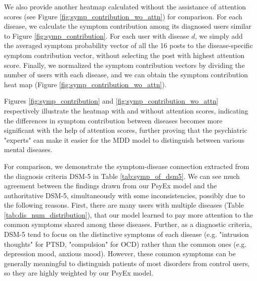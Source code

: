 We also provide another heatmap calculated without the assistance of attention scores (see Figure \ref{fig:symp_contribution_wo_attn}) for comparison.
For each disease, we calculate the symptom contribution among its diagnosed users similar to Figure \ref{fig:symp_contribution}. For each user with disease $d$, we simply add the averaged symptom probability vector of all the 16 posts to the disease-specific symptom contribution vector, without selecting the post with highest attention score.
Finally, we normalized the symptom contribution vectors by dividing the number of users with each disease, and we can obtain the symptom contribution heat map (Figure \ref{fig:symp_contribution_wo_attn}). 

Figures \ref{fig:symp_contribution} and \ref{fig:symp_contribution_wo_attn} respectively illustrate the heatmap with and without attention scores, indicating the differences in symptom contribution between diseases becomes more significant with the help of attention scores, further proving that the psychiatric "experts" can make it easier for the MDD model to distinguish between various mental diseases. 

For comparison, we demonstrate the symptom-disease connection extracted from the diagnosis criteria DSM-5 in Table \ref{tab:symp_of_dsm5}. 
We can see much agreement between the findings drawn from our PsyEx model and the authoritative DSM-5, simultaneously with some inconsistencies, possibly due to the following reasons. First, there are many users with multiple diseases (Table \ref{tab:dis_num_distribution}), that our model learned to pay more attention to the common symptoms shared among these diseases.
Further, as a diagnostic criteria, DSM-5 tend to focus on the distinctive symptoms of each disease (e.g. "intrusion thoughts" for PTSD, "compulsion" for OCD) rather than the common ones (e.g. depression mood, anxious mood). However, these common symptoms can be generally meaningful to distinguish patients of most disorders from control users, so they are highly weighted by our PsyEx model.
